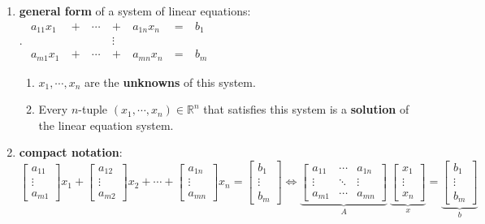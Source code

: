 \begin{enumerate}
    \item \textbf{general form} of a system of linear equations:
    \\
    .\hfill
    $
        \begin{aligned}
            a_{11}x_1\  & +\ & \cdots\ & +\ & a_{1n}x_n\ & =\ & b_1 \\
            & & & \vdots \\
            a_{m1}x_1\  & +\ & \cdots\ & +\ & a_{mn}x_n\ & =\ & b_m
        \end{aligned}
    $
    \hfill \cite{mfml/book/mml/Deisenroth-Faisal-Ong}
    \vspace{0.2cm}
    \begin{enumerate}
        \item $x_1, \cdots , x_n$ are the \textbf{unknowns} of this system.

        \item Every $n$-tuple $(x_1, \cdots , x_n) \in \mathbb{R}^n$ that satisfies this system is a \textbf{solution} of the linear equation system.
    \end{enumerate}


    \item \textbf{compact notation}:
    \\[0.2cm]
    $
        \begin{bmatrix}a_{11}\\ \vdots\\ a_{m1}\end{bmatrix} x_1 +
        \begin{bmatrix}a_{12}\\ \vdots\\ a_{m2}\end{bmatrix} x_2 +
        \cdots +
        \begin{bmatrix}a_{1n}\\ \vdots\\ a_{mn}\end{bmatrix} x_n =
        \begin{bmatrix}b_{1}\\ \vdots\\ b_{m}\end{bmatrix}
    \Longleftrightarrow
        \underset{A}{\underbrace{\begin{bmatrix}
            a_{11} & \cdots & a_{1n} \\
            \vdots & \ddots & \vdots \\
            a_{m1} & \cdots & a_{mn}
        \end{bmatrix}}} \
        \underset{x}{\underbrace{\begin{bmatrix} x_{1} \\ \vdots \\ x_{n} \end{bmatrix}}}
        =
        \underset{b}{\underbrace{\begin{bmatrix} b_{1} \\ \vdots \\ b_{m} \end{bmatrix}}}
    $
    \hfill \cite{mfml/book/mml/Deisenroth-Faisal-Ong}


\end{enumerate}
